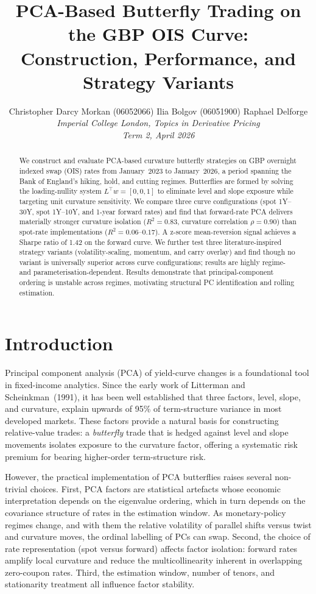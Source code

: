 \documentclass[11pt,a4paper]{article}
\title{\textbf{PCA-Based Butterfly Trading on the GBP OIS Curve:\\
Construction, Performance, and Strategy Variants}}
\author{
Christopher Darcy Morkan (06052066) \quad Ilia Bolgov (06051900) \quad Raphael Delforge\\[4pt]
\textit{Imperial College London,  Topics in Derivative Pricing}\\[2pt]
\textit{Term 2, April 2026}
}
\date{}
\begin{document}
\maketitle

\begin{abstract}
We construct and evaluate PCA-based curvature butterfly strategies on
GBP overnight indexed swap (OIS) rates from January~2023 to January~2026,
a period spanning the Bank of England's hiking, hold, and cutting
regimes.  Butterflies are formed by solving the loading-nullity system
$L^{\!\top}w = [0,0,1]$ to eliminate level and slope exposure while
targeting unit curvature sensitivity.  We compare three curve
configurations (spot 1Y--30Y, spot 1Y--10Y, and 1-year forward
rates) and find that forward-rate PCA delivers materially stronger
curvature isolation ($R^{2}=0.83$, curvature correlation $\rho=0.90$)
than spot-rate implementations ($R^{2}=0.06$--$0.17$).  A z-score
mean-reversion signal achieves a Sharpe ratio of 1.42 on the forward
curve.  We further test three literature-inspired strategy
variants (volatility-scaling, momentum, and carry overlay) and find
though no variant is universally superior across curve configurations;
results are highly regime- and parameterisation-dependent.
Results demonstrate that principal-component ordering is unstable across
regimes, motivating structural PC identification and rolling estimation.
\end{abstract}

\section{Introduction}
\label{sec:intro}
Principal component analysis (PCA) of yield-curve changes is a
foundational tool in fixed-income analytics.  Since the early work of
Litterman and Scheinkman~(1991), it has been well established that three
factors, level, slope, and curvature, explain upwards of 95\% of
term-structure variance in most developed markets.  These factors
provide a natural basis for constructing relative-value trades:  a
\emph{butterfly} trade that is hedged against level and slope movements
isolates exposure to the curvature factor, offering a systematic
risk premium for bearing higher-order term-structure risk.

However, the practical implementation of PCA butterflies raises several
non-trivial choices.  First, PCA factors are statistical artefacts whose
economic interpretation depends on the eigenvalue ordering, which in turn
depends on the covariance structure of rates in the estimation window.
As monetary-policy regimes change, and with them the relative volatility
of parallel shifts versus twist and curvature moves, the ordinal
labelling of PCs can swap.  Second, the choice of rate representation
(spot versus forward) affects factor isolation: forward rates amplify
local curvature and reduce the multicollinearity inherent in overlapping
zero-coupon rates.  Third, the estimation window, number of tenors, and
stationarity treatment all influence factor stability.
\end{document}
